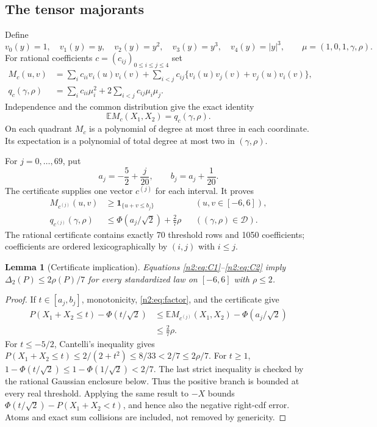 \documentclass[11pt,a4paper]{article}
\numberwithin{equation}{section}
\newtheorem{lemma}[theorem]{Lemma}
\theoremstyle{definition}
\theoremstyle{remark}
\newcommand{\E}{\mathbb E}
\begin{document}
\subsection{The tensor majorants}
Define
\[
 v_0(y)=1,\quad v_1(y)=y,\quad v_2(y)=y^2,
 \quad v_3(y)=y^3,\quad v_4(y)=|y|^3,
 \qquad \mu=(1,0,1,\gamma,\rho).
\]
For rational coefficients $c=(c_{ij})_{0\le i\le j\le4}$ set
\begin{align}
 M_c(u,v)&=\sum_i c_{ii}v_i(u)v_i(v)
 +\sum_{i<j}c_{ij}\{v_i(u)v_j(v)+v_j(u)v_i(v)\},\label{n2:eq:tensor}\\
 q_c(\gamma,\rho)&=\sum_i c_{ii}\mu_i^2
                 +2\sum_{i<j}c_{ij}\mu_i\mu_j.\label{n2:eq:expect}
\end{align}
Independence and the common distribution give the exact identity
\begin{equation}\label{n2:eq:factor}
                      \E M_c(X_1,X_2)=q_c(\gamma,\rho).
\end{equation}
On each quadrant $M_c$ is a polynomial of degree at most three in each
coordinate. Its expectation is a polynomial of total degree at most two
in $(\gamma,\rho)$.

For $j=0,\ldots,69$, put
\[
 a_j=-\frac52+\frac j{20},\qquad b_j=a_j+\frac1{20}.
\]
The certificate supplies one vector $c^{(j)}$ for each interval. It proves
\begin{align}
 M_{c^{(j)}}(u,v)&\ge\mathbf1_{\{u+v\le b_j\}}
                 &&(u,v\in[-6,6]),\label{n2:eq:C1}\\
 q_{c^{(j)}}(\gamma,\rho)&\le\Phi(a_j/\sqrt2)+\frac27\rho
                 &&((\gamma,\rho)\in\mathcal D).\label{n2:eq:C2}
\end{align}
The rational certificate contains exactly 70 threshold rows and 1050 coefficients;
coefficients are ordered lexicographically by $(i,j)$ with $i\le j$.

\begin{lemma}[Certificate implication]\label{n2:lem:certimp}
Equations \eqref{n2:eq:C1}--\eqref{n2:eq:C2} imply
$\Delta_2(P)\le2\rho(P)/7$ for every standardized law on $[-6,6]$ with
$\rho\le2$.
\end{lemma}
\begin{proof}
If $t\in[a_j,b_j]$, monotonicity, \eqref{n2:eq:factor}, and the certificate give
\begin{align*}
 P(X_1+X_2\le t)-\Phi(t/\sqrt2)
 &\le\E M_{c^{(j)}}(X_1,X_2)-\Phi(a_j/\sqrt2)\\
 &\le\frac27\rho.
\end{align*}
For $t\le-5/2$, Cantelli's inequality gives
$P(X_1+X_2\le t)\le2/(2+t^2)\le8/33<2/7\le2\rho/7$.
For $t\ge1$, $1-\Phi(t/\sqrt2)\le1-\Phi(1/\sqrt2)<2/7$.
The last strict inequality is checked by the rational Gaussian enclosure below.
Thus the positive branch is bounded at every real threshold.
Applying the same result to $-X$ bounds
$\Phi(t/\sqrt2)-P(X_1+X_2<t)$, and hence also the negative right-cdf error.
Atoms and exact sum collisions are included, not removed by genericity.
\end{proof}
\end{document}
